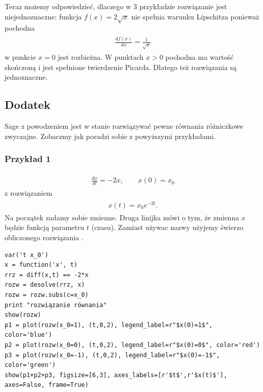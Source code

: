 \documentclass[a4paper,12pt,polish]{sphinxmanual}
\begin{document}
Teraz możemy odpowiedzieć, dlaczego w 3 przykładzie rozwiązanie jest niejednoznaczne: funkcja $f(x) = 2\sqrt x$ nie spełnia warunku Lipschitza ponieważ pochodna
\label{ch1/chI012:equation-eqn11}\begin{gather}
\begin{split}\frac{df(x)}{dx} = \frac{1}{\sqrt x}\end{split}\label{ch1/chI012-eqn11}
\end{gather}
w punkcie $x=0$ jest rozbieżna. W punktach $x>0$  pochodna ma wartość skończoną i jest spełnione twierdzenie Picarda. Dlatego też  rozwiązania są jednoznaczne.


\subsection{Dodatek}
\label{ch1/chI012:dodatek}
Sage z powodzeniem jest w stanie rozwiązywać pewne równania różniczkowe zwyczajne. Zobaczmy jak poradzi sobie z powyższymi przykładami.


\subsubsection{Przykład 1}
\label{ch1/chI012:id1}\label{ch1/chI012:equation-eqn12}\begin{gather}
\begin{split}\frac{dx}{dt}=-2x, \qquad x(0) = x_0\end{split}\label{ch1/chI012-eqn12}
\end{gather}
z rozwiązaniem
\label{ch1/chI012:equation-eqn13}\begin{gather}
\begin{split}x(t) = x_0   e^{-2t}.\end{split}\label{ch1/chI012-eqn13}
\end{gather}
Na początek zadamy sobie zmienne. Druga linijka mówi o tym, że zmienna $x$ będzie funkcją parametru $t$ (czasu). Zamiast
używac nazwy  użyjemy świerzo obliczonego rozwiązania .


\begin{verbatim}
var('t x_0')
x = function('x', t)
rrz = diff(x,t) == -2*x
rozw = desolve(rrz, x)
rozw = rozw.subs(c=x_0)
print "rozwiązanie równania"
show(rozw)
p1 = plot(rozw(x_0=1), (t,0,2), legend_label=r"$x(0)=1$", color='blue')
p2 = plot(rozw(x_0=0), (t,0,2), legend_label=r"$x(0)=0$", color='red')
p3 = plot(rozw(x_0=-1), (t,0,2), legend_label=r"$x(0)=-1$", color='green')
show(p1+p2+p3, figsize=[6,3], axes_labels=[r'$t$',r'$x(t)$'], axes=False, frame=True)
\end{verbatim}
\end{document}
